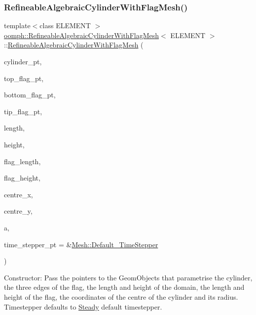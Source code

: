 \subsubsection{\texorpdfstring{Refineable\+Algebraic\+Cylinder\+With\+Flag\+Mesh()}{RefineableAlgebraicCylinderWithFlagMesh()}}
{\footnotesize\ttfamily template$<$class E\+L\+E\+M\+E\+NT $>$ \\
\hyperlink{classoomph_1_1RefineableAlgebraicCylinderWithFlagMesh}{oomph\+::\+Refineable\+Algebraic\+Cylinder\+With\+Flag\+Mesh}$<$ E\+L\+E\+M\+E\+NT $>$\+::\hyperlink{classoomph_1_1RefineableAlgebraicCylinderWithFlagMesh}{Refineable\+Algebraic\+Cylinder\+With\+Flag\+Mesh} (\begin{DoxyParamCaption}\item[{\hyperlink{classoomph_1_1Circle}{Circle} $\ast$}]{cylinder\+\_\+pt,  }\item[{\hyperlink{classoomph_1_1GeomObject}{Geom\+Object} $\ast$}]{top\+\_\+flag\+\_\+pt,  }\item[{\hyperlink{classoomph_1_1GeomObject}{Geom\+Object} $\ast$}]{bottom\+\_\+flag\+\_\+pt,  }\item[{\hyperlink{classoomph_1_1GeomObject}{Geom\+Object} $\ast$}]{tip\+\_\+flag\+\_\+pt,  }\item[{const double \&}]{length,  }\item[{const double \&}]{height,  }\item[{const double \&}]{flag\+\_\+length,  }\item[{const double \&}]{flag\+\_\+height,  }\item[{const double \&}]{centre\+\_\+x,  }\item[{const double \&}]{centre\+\_\+y,  }\item[{const double \&}]{a,  }\item[{\hyperlink{classoomph_1_1TimeStepper}{Time\+Stepper} $\ast$}]{time\+\_\+stepper\+\_\+pt = {\ttfamily \&\hyperlink{classoomph_1_1Mesh_a12243d0fee2b1fcee729ee5a4777ea10}{Mesh\+::\+Default\+\_\+\+Time\+Stepper}} }\end{DoxyParamCaption})\hspace{0.3cm}{\ttfamily [inline]}}



Constructor\+: Pass the pointers to the Geom\+Objects that parametrise the cylinder, the three edges of the flag, the length and height of the domain, the length and height of the flag, the coordinates of the centre of the cylinder and its radius. Timestepper defaults to \hyperlink{classoomph_1_1Steady}{Steady} default timestepper. 



